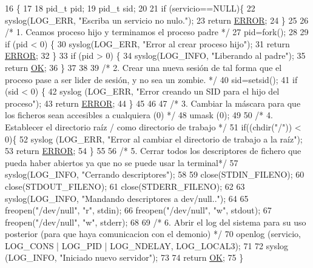 \begin{DoxyCode}
16                                  \{
17 
18         pid\_t pid;
19         pid\_t sid;
20 
21         \textcolor{keywordflow}{if} (servicio==NULL)\{
22                 syslog(LOG\_ERR, \textcolor{stringliteral}{"Escriba un servicio no nulo."});
23                 \textcolor{keywordflow}{return} \hyperlink{daemon_8h_a8fe83ac76edc595f6b98cd4a4127aed5}{ERROR};
24         \}
25 
26         \textcolor{comment}{/* 1. Ceamos proceso hijo y terminamos el proceso padre */}
27         pid=fork();
28 
29         \textcolor{keywordflow}{if} (pid < 0) \{
30                 syslog(LOG\_ERR, \textcolor{stringliteral}{"Error al crear proceso hijo"});
31                 \textcolor{keywordflow}{return} \hyperlink{daemon_8h_a8fe83ac76edc595f6b98cd4a4127aed5}{ERROR};
32         \}
33         \textcolor{keywordflow}{if} (pid > 0) \{
34                 syslog(LOG\_INFO, \textcolor{stringliteral}{"Liberando al padre"});
35                 \textcolor{keywordflow}{return} \hyperlink{daemon_8h_aba51915c87d64af47fb1cc59348961c9}{OK};
36         \}
37 
38         
39         \textcolor{comment}{/* 2. Crear una nueva sesión de tal forma que el proceso pase a ser lider de sesión, y no sea un
       zombie. */}
40         sid=setsid();
41         \textcolor{keywordflow}{if} (sid < 0) \{
42                 syslog (LOG\_ERR, \textcolor{stringliteral}{"Error creando un SID para el hijo del proceso"});
43                 \textcolor{keywordflow}{return} \hyperlink{daemon_8h_a8fe83ac76edc595f6b98cd4a4127aed5}{ERROR};
44         \}
45 
46         
47         \textcolor{comment}{/* 3. Cambiar la máscara para que los ficheros sean accesibles a cualquiera (0) */}
48         umask (0);
49 
50         \textcolor{comment}{/* 4. Establecer el directorio raíz / como directorio de trabajo */}
51         \textcolor{keywordflow}{if}((chdir(\textcolor{stringliteral}{"/"})) < 0)\{
52                 syslog (LOG\_ERR, \textcolor{stringliteral}{"Error al cambiar el directorio de trabajo a la raíz"});
53                 \textcolor{keywordflow}{return} \hyperlink{daemon_8h_a8fe83ac76edc595f6b98cd4a4127aed5}{ERROR};
54         \}
55 
56         \textcolor{comment}{/* 5. Cerrar todos los descriptores de fichero que pueda haber abiertos ya que no se puede usar la
       terminal*/}
57         syslog(LOG\_INFO, \textcolor{stringliteral}{"Cerrando descriptores"});
58 
59         close(STDIN\_FILENO); 
60         close(STDOUT\_FILENO);
61         close(STDERR\_FILENO);
62 
63         syslog(LOG\_INFO, \textcolor{stringliteral}{"Mandando descriptores a dev/null.."});
64         
65         freopen(\textcolor{stringliteral}{"/dev/null"}, \textcolor{stringliteral}{"r"}, stdin);
66         freopen(\textcolor{stringliteral}{"/dev/null"}, \textcolor{stringliteral}{"w"}, stdout);
67         freopen(\textcolor{stringliteral}{"/dev/null"}, \textcolor{stringliteral}{"w"}, stderr);
68 
69         \textcolor{comment}{/* 6. Abrir el log del sistema para su uso posterior (para que haya comunicacion con el demonio) */}
70         openlog (servicio, LOG\_CONS | LOG\_PID | LOG\_NDELAY, LOG\_LOCAL3);
71 
72         syslog (LOG\_INFO, \textcolor{stringliteral}{"Iniciado nuevo servidor"});
73 
74         \textcolor{keywordflow}{return} \hyperlink{daemon_8h_aba51915c87d64af47fb1cc59348961c9}{OK};
75 \}
\end{DoxyCode}
